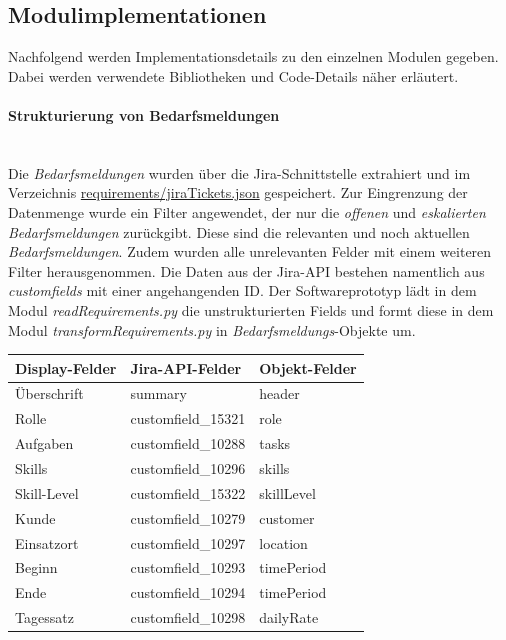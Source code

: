 \subsection{Modulimplementationen}
Nachfolgend werden Implementationsdetails zu den einzelnen Modulen gegeben. Dabei werden verwendete Bibliotheken und Code-Details näher erläutert.
\paragraph{Strukturierung von Bedarfsmeldungen}\mbox{}\\
Die \emph{Bedarfsmeldungen} wurden über die Jira-Schnittstelle extrahiert und im Verzeichnis \url{requirements/jiraTickets.json} gespeichert. Zur Eingrenzung der Datenmenge wurde ein Filter angewendet, der nur die \emph{offenen} und \emph{eskalierten} \emph{Bedarfsmeldungen} zurückgibt. Diese sind die relevanten und noch aktuellen \emph{Bedarfsmeldungen}. Zudem wurden alle unrelevanten Felder mit einem weiteren Filter herausgenommen. Die Daten aus der Jira-API bestehen namentlich aus \emph{customfields} mit einer angehangenden ID. Der Softwareprototyp lädt in dem Modul \emph{readRequirements.py} die unstrukturierten Fields und formt diese in dem Modul \emph{transformRequirements.py} in \emph{Bedarfsmeldungs}-Objekte um.
\begin{center}
	\begin{tabularx}{1\textwidth} { 
			| >{\raggedright\arraybackslash}X 
			| >{\raggedright\arraybackslash}X
			| >{\raggedright\arraybackslash}X | }
		\hline
		Display-Felder & Jira-API-Felder & Objekt-Felder \\
		\hline
		\hline
		Überschrift & summary & header\\
		\hline
		Rolle & customfield\_15321 & role\\
		\hline
		Aufgaben & customfield\_10288 & tasks\\
		\hline
		Skills & customfield\_10296 & skills\\
		\hline
		Skill-Level & customfield\_15322 & skillLevel\\
		\hline
		Kunde & customfield\_10279 & customer\\
		\hline
		Einsatzort & customfield\_10297 & location\\
		\hline
		Beginn & customfield\_10293 & timePeriod\\
		\hline
		Ende & customfield\_10294 & timePeriod\\
		\hline
		Tagessatz & customfield\_10298 & dailyRate\\
		\hline
	\end{tabularx}\\
	\label{tab:jiradaten}
\end{center}
